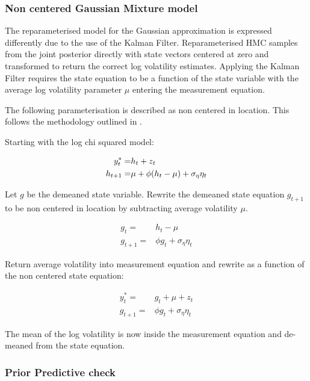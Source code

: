 \documentclass[12pt, a4paper]{article}
\begin{document}
        \subsubsection{Non centered Gaussian Mixture model}
        The reparameterised model for the Gaussian approximation is expressed differently due to the use of the Kalman Filter. Reparameterised HMC samples from the joint posterior directly with state vectors centered at zero and transformed to return the correct log volatility estimates. Applying the Kalman Filter requires the state equation to be a function of the state variable with the average log volatility parameter $\mu$ entering the measurement equation.

        The following parameterisation is described as non centered in location. This follows the methodology outlined in \citet{strickland2008parameterisation}.
        
        Starting with the log chi squared model:

        $$
        \begin{aligned}
        y^{\ast}_t =& h_t + z_t \\
        h_{t+1} =& \space \mu +\phi(h_t - \mu) + \sigma_{\eta} \eta_t
        \end{aligned}
        $$
        

        Let $g$ be the demeaned state variable. Rewrite the demeaned state equation $g_{t+1}$ to be non centered in location by subtracting average volatility $\mu$.

        $$
        \begin{aligned}
        g_t =& h_t - \mu \\
        g_{t+1} =& \phi g_t + \sigma_{\eta}\eta_{t}
        \end{aligned}
        $$

        Return average volatility into measurement equation and rewrite as a function of the non centered state equation:

        $$
        \begin{aligned}
        y^{\ast}_t =& g_t + \mu + z_t \\
        g_{t+1} =& \phi g_t + \sigma_{\eta}\eta_{t}
        \end{aligned}
        $$

        The mean of the log volatility is now inside the measurement equation and de-meaned from the state equation.
    
    \subsubsection{Prior Predictive check}
\end{document}

